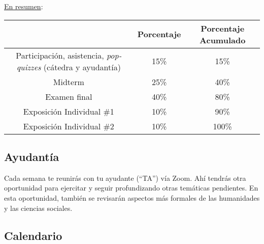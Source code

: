 \documentclass[letterpaper]{article}
\begin{document}
\underline{En resumen}:

\begin{table}[h]
\begin{tabular}{ccc}
							& \textbf{Porcentaje} & {\bf Porcentaje Acumulado} \\
							\hline
Participaci\'on, asistencia, \emph{pop-quizzes} (c\'atedra y ayudant\'ia) & 15\%       & 15\%                 \\
\hline
Midterm 				& 25\% & 40\%                 \\
Examen final 		& 40\% & 80\%                 \\
\hline
Exposici\'on Individual \#1 	& 10\% & 90\%    \\
Exposici\'on Individual \#2 	& 10\% & 100\%    \\
\hline             
\end{tabular}
\end{table}

\subsection*{Ayudant\'ia}

Cada semana te reunir\'as con tu ayudante (``TA'') v\'ia Zoom. Ah\'i tendr\'as otra oportunidad para ejercitar y seguir profundizando otras tem\'aticas pendientes. En esta oportunidad, tambi\'en se revisar\'an aspectos m\'as formales de las humanidades y las ciencias sociales. 


\subsection*{Calendario}
\end{document}
